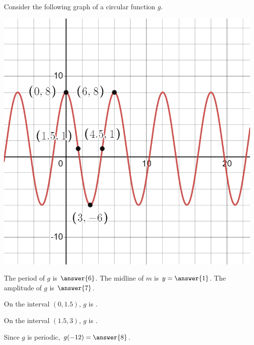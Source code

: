 \documentclass{ximera}
\author{Kenneth Berglund}
\begin{document}
\begin{exercise}
Consider the following graph of a circular function $g$.

\includegraphics[width=1\linewidth]{ex12.png}

The period of $g$ is $\answer{6}$. The midline of $m$ is $y = \answer{1}$. The amplitude of $g$ is $\answer{7}$.

On the interval $(0, 1.5)$, $g$ is .

On the interval $(1.5, 3)$, $g$ is .

Since $g$ is periodic, $g(-12) = \answer{8}$. 


\end{exercise}
\end{document}
